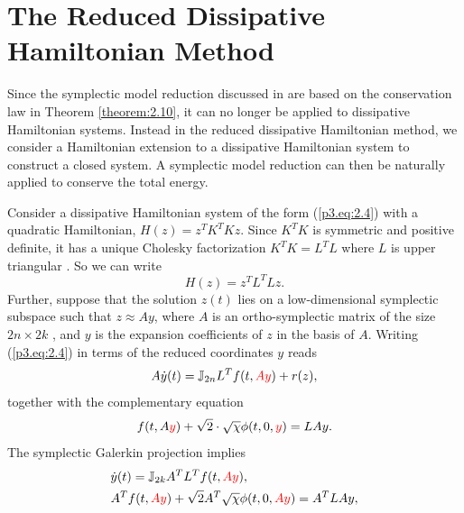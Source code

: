 \section{The Reduced Dissipative Hamiltonian Method} \label{p3.sec:3}

Since the symplectic model reduction discussed in  are based on the conservation law in Theorem \ref{theorem:2.10}, it can no longer be applied to dissipative Hamiltonian systems. Instead in the reduced dissipative Hamiltonian method, we consider a Hamiltonian extension to a dissipative Hamiltonian system to construct a closed system. A symplectic model reduction can then be naturally applied to conserve the total energy.

Consider a dissipative Hamiltonian system of the form (\ref{p3.eq:2.4}) with a quadratic Hamiltonian, $H(z) = z^TK^TKz$. Since $K^TK$ is symmetric and positive definite, it has a unique Cholesky factorization $K^TK = L^T L$ where $L$ is upper triangular \cite{strang09}. So we can write 
\begin{equation} \label{p3.eq:3.7}
H(z) = z^T L^T L z.
\end{equation}
Further, suppose that the solution $z(t)$ lies on a low-dimensional symplectic subspace such that $z \approx Ay$, where $A$ is an ortho-symplectic matrix of the size $2n\times 2k$ , and $y$ is the expansion coefficients of $z$ in the basis of $A$.
Writing (\ref{p3.eq:2.4}) in terms of the reduced coordinates $y$ reads
\begin{equation} \label{p3.eq:3.9}
		A\dot{y}(t) = \mathbb J_{2n} L^T f(t,{\color{red} Ay}) + r(z),
\end{equation}
together with the complementary equation
\begin{equation} \label{p3.eq:3.10}
	f(t,A{\color{red} y}) + \sqrt 2 \cdot \sqrt{\chi} \phi(t,0,{\color{red} y}) = LAy.
\end{equation}
The symplectic Galerkin projection implies
\begin{align} \label{p3.eq:3.11}
	& \dot y(t) = \mathbb J_{2k} A^T L^T f(t,{\color{red} Ay}), \\
	& A^T f(t,{\color{red} Ay}) + \sqrt{2} A^T \sqrt{\chi} \phi(t,0,{\color{red} Ay}) = A^T L A y,
\end{align}
